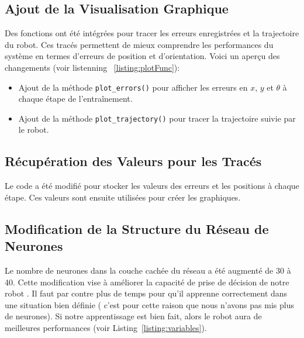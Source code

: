 \documentclass{article}
\begin{document}
\subsection*{Ajout de la Visualisation Graphique}
Des fonctions ont été intégrées pour tracer les erreurs enregistrées et la trajectoire du robot. Ces tracés permettent de mieux comprendre les performances du système en termes d'erreurs de position et d'orientation. Voici un aperçu des changements (voir listenning ~\ref{listing:plotFunc}):
\begin{itemize}
    \item Ajout de la méthode \texttt{plot\_errors()} pour afficher les erreurs en $x$, $y$ et $\theta$ à chaque étape de l'entraînement.
    \item Ajout de la méthode \texttt{plot\_trajectory()} pour tracer la trajectoire suivie par le robot.
\end{itemize}

\subsection*{Récupération des Valeurs pour les Tracés}
Le code a été modifié pour stocker les valeurs des erreurs et les positions à chaque étape. Ces valeurs sont ensuite utilisées pour créer les graphiques.

\subsection*{Modification de la Structure du Réseau de Neurones}
Le nombre de neurones dans la couche cachée du réseau a été augmenté de 30 à 40. Cette modification vise à améliorer la capacité de prise de décision de notre robot . Il faut par contre plus de temps pour qu'il apprenne correctement dans une situation bien définie ( c'est pour cette raison que nous n'avons pas mis plus de neurones). Si notre apprentissage est bien fait, alors le robot aura de meilleures performances (voir Listing~\ref{listing:variables}).
\end{document}
